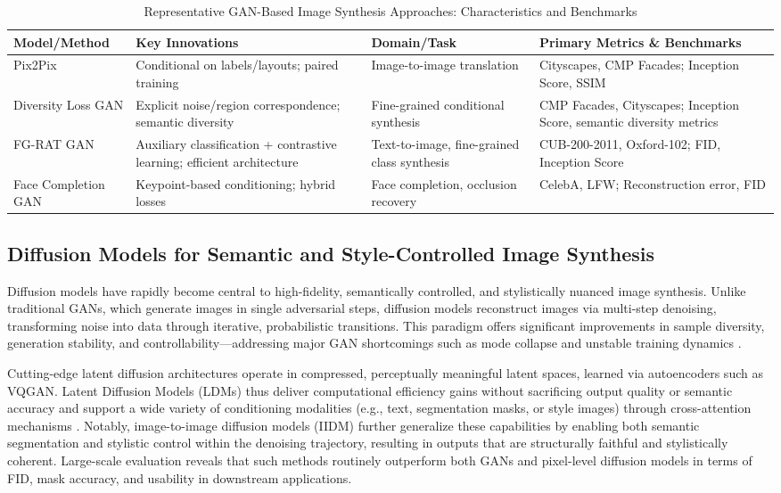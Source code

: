 \documentclass[sigconf]{acmart}
\begin{document}
\begin{table*}[htbp]
\centering
\caption{Representative GAN-Based Image Synthesis Approaches: Characteristics and Benchmarks}
\label{tab:gan_comparison}
\begin{adjustbox}{max width=\textwidth}
\begin{tabular}{llll}
\toprule
\textbf{Model/Method} & \textbf{Key Innovations} & \textbf{Domain/Task} & \textbf{Primary Metrics \& Benchmarks} \\
\midrule
Pix2Pix & Conditional on labels/layouts; paired training & Image-to-image translation & Cityscapes, CMP Facades; Inception Score, SSIM \\
Diversity Loss GAN & Explicit noise/region correspondence; semantic diversity & Fine-grained conditional synthesis & CMP Facades, Cityscapes; Inception Score, semantic diversity metrics \\
FG-RAT GAN & Auxiliary classification + contrastive learning; efficient architecture & Text-to-image, fine-grained class synthesis & CUB-200-2011, Oxford-102; FID, Inception Score \\
Face Completion GAN & Keypoint-based conditioning; hybrid losses & Face completion, occlusion recovery & CelebA, LFW; Reconstruction error, FID \\
\bottomrule
\end{tabular}
\end{adjustbox}
\end{table*}

\subsection{Diffusion Models for Semantic and Style-Controlled Image Synthesis}

Diffusion models have rapidly become central to high-fidelity, semantically controlled, and stylistically nuanced image synthesis. Unlike traditional GANs, which generate images in single adversarial steps, diffusion models reconstruct images via multi-step denoising, transforming noise into data through iterative, probabilistic transitions. This paradigm offers significant improvements in sample diversity, generation stability, and controllability—addressing major GAN shortcomings such as mode collapse and unstable training dynamics \cite{ref76,ref90}.

Cutting-edge latent diffusion architectures operate in compressed, perceptually meaningful latent spaces, learned via autoencoders such as VQGAN. Latent Diffusion Models (LDMs) thus deliver computational efficiency gains without sacrificing output quality or semantic accuracy and support a wide variety of conditioning modalities (e.g., text, segmentation masks, or style images) through cross-attention mechanisms \cite{ref73,ref76,ref90,ref102}. Notably, image-to-image diffusion models (IIDM) further generalize these capabilities by enabling both semantic segmentation and stylistic control within the denoising trajectory, resulting in outputs that are structurally faithful and stylistically coherent. Large-scale evaluation reveals that such methods routinely outperform both GANs and pixel-level diffusion models in terms of FID, mask accuracy, and usability in downstream applications.
\end{document}
